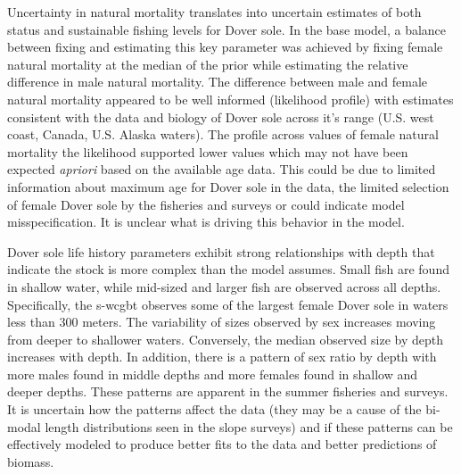 \documentclass[11pt,
  english,
  a4paper,
]{article}
\begin{document}
\leavevmode\tagmcend\tagstructend\par


Uncertainty in natural mortality translates into uncertain estimates of both status and sustainable fishing levels for Dover sole. In the base model, a balance between fixing and estimating this key parameter was achieved by fixing female natural mortality at the median of the prior while estimating the relative difference in male natural mortality. The difference between male and female natural mortality appeared to be well informed (likelihood profile) with estimates consistent with the data and biology of Dover sole across it's range (U.S. west coast, Canada, U.S. Alaska waters). The profile across values of female natural mortality the likelihood supported lower values which may not have been expected \emph{apriori} based on the available age data. This could be due to limited information about maximum age for Dover sole in the data, the limited selection of female Dover sole by the fisheries and surveys or could indicate model misspecification. It is unclear what is driving this behavior in the model.

\leavevmode\tagmcend\tagstructend\par


Dover sole life history parameters exhibit strong relationships with depth that indicate the stock is more complex than the model assumes. Small fish are found in shallow water, while mid-sized and larger fish are observed across all depths. Specifically, the \gls{s-wcgbt} observes some of the largest female Dover sole in waters less than 300 meters. The variability of sizes observed by sex increases moving from deeper to shallower waters. Conversely, the median observed size by depth increases with depth. In addition, there is a pattern of sex ratio by depth with more males found in middle depths and more females found in shallow and deeper depths. These patterns are apparent in the summer fisheries and surveys. It is uncertain how the patterns affect the data (they may be a cause of the bi-modal length distributions seen in the slope surveys) and if these patterns can be effectively modeled to produce better fits to the data and better predictions of biomass.

\leavevmode\tagmcend\tagstructend\par
\end{document}
